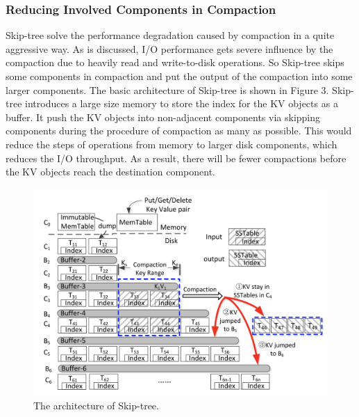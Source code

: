 \documentclass[a4paper,10pt,twoside]{article}
\begin{document}
\subsubsection{Reducing Involved Components in Compaction}
Skip-tree \cite{7569086} solve the performance degradation caused by compaction in a quite aggressive way.
As is discussed, I/O performance gets severe influence by the compaction due to heavily read and write-to-disk operations.
So Skip-tree skips some components in compaction and put the output of the compaction into some larger components.
The basic architecture of Skip-tree is shown in Figure 3.
Skip-tree introduces a large size memory to store the index for the KV objects as a buffer.
It push the KV objects into non-adjacent components via skipping components during the procedure of compaction as many as possible.
This would reduce the steps of operations from memory to larger disk components, which reduces the I/O throughput.
As a result, there will be fewer compactions before the KV objects reach the destination component.
\begin{figure}[h]
    \centering
	\includegraphics[scale=0.3]{Skip-tree.png}
    \caption{ The architecture of Skip-tree.}
    \label{fig:mesh1}
\end{figure}
\end{document}
